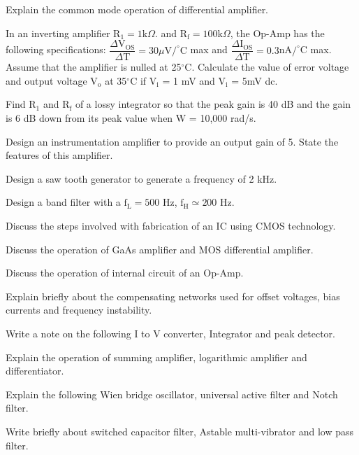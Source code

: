 \markA
\partB

\item Explain the common mode operation of differential amplifier.
\item In an inverting amplifier $\text{R}_1 = 1$k$\Omega$. and $\text{R}_\text{f} = 100$k$\Omega$,
  the Op-Amp has the 
  following specifications: $\dfrac{\Delta\text{V}_{\text{OS}}}{\Delta \text{T}} =
  30\mu\text{V}/^{\circ}\text{C}$ max and 
  $\dfrac{\Delta \text{I}_{\text{OS}}}{\Delta \text{T}} = 0.3 $nA$/^{\circ}$C max. Assume
  that the amplifier is 
  nulled at 25$^\circ$C. Calculate the value of error voltage and output voltage
  $\text{V}_{\text{o}}$ at 35$^\circ$C
  if $\text{V}_{\text{i}}$ = 1 mV and $\text{V}_{\text{i}}$ = 5mV dc.

\item Find $\text{R}_1$ and $\text{R}_\text{f}$ of a lossy integrator so that the peak gain is
  40 dB and the gain is 6 dB down from its peak value when W = 10,000 rad/s.
\item Design an instrumentation amplifier to provide an output gain of 5. State the features
  of this amplifier.
\item Design a saw tooth generator to generate a frequency of 2 kHz.
\item Design a band filter with a $\text{f}_\text{L} = 500$ Hz, $\text{f}_\text{H} \simeq 200$ Hz.

\markB
\partC

\item Discuss the steps involved with fabrication of an IC using CMOS technology.
\Or
\item Discuss the operation of GaAs amplifier and MOS differential amplifier.

\newpage \again

\item Discuss the operation of internal circuit of an Op-Amp.
\Or
\item Explain briefly about the compensating networks used for offset voltages, bias currents and frequency 
  instability.

\item Write a note on the following I to V converter, Integrator and peak detector.
\Or
\item Explain the operation of summing amplifier, logarithmic amplifier and differentiator.

\item Explain the following Wien bridge oscillator, universal active filter and Notch filter.
\Or
\item Write briefly about switched capacitor filter, Astable multi-vibrator and low pass filter.

\markC
\ene
